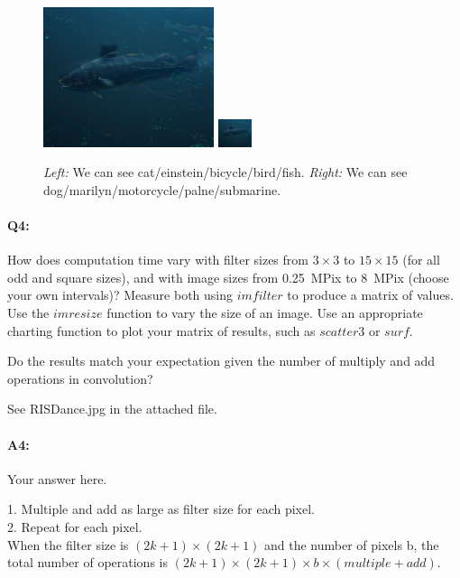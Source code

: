 \begin{figure}[h]
	    		\includegraphics[width=5cm]{fish&submarine.jpg}
	    		\includegraphics[width=1cm]{fish&submarine.jpg}
	    		\caption{\emph{Left:} We can see cat/einstein/bicycle/bird/fish. \emph{Right:} We can see dog/marilyn/motorcycle/palne/submarine.}
	    		\label{fig:result2}
		\end{figure}

	
	
	\pagebreak
	\paragraph{Q4:} How does computation time vary with filter sizes from $3\times3$ to $15\times15$ (for all odd and square sizes), and with image sizes from 0.25~MPix to 8~MPix (choose your own intervals)? Measure both using \href{https://www.mathworks.com/help/images/ref/imfilter.html}{$imfilter$} to produce a matrix of values. Use the \href{https://www.mathworks.com/help/images/ref/imresize.html}{$imresize$} function to vary the size of an image. Use an appropriate charting function to plot your matrix of results, such as \href{https://www.mathworks.com/help/matlab/ref/scatter3.html}{$scatter3$} or \href{https://www.mathworks.com/help/matlab/ref/surf.html}{$surf$}.
	
	Do the results match your expectation given the number of multiply and add operations in convolution?
	
	See RISDance.jpg in the attached file.
	
	\paragraph{A4:} Your answer here.

	1. Multiple and add as large as filter size for each pixel.\\
	2. Repeat for each pixel.\\
	When the filter size is $(2k+1) \times (2k+1)$ and the number of pixels b, the total number of operations is $(2k+1) \times (2k+1) \times b \times (multiple+add)$.
	

